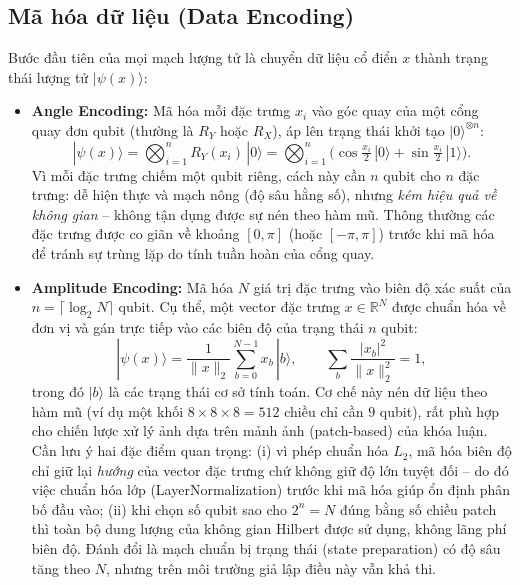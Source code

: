 \subsection{Mã hóa dữ liệu (Data Encoding)}
Bước đầu tiên của mọi mạch lượng tử là chuyển dữ liệu cổ điển $x$ thành trạng thái lượng tử $|\psi(x)\rangle$:
\begin{itemize}
    \item \textbf{Angle Encoding:} Mã hóa mỗi đặc trưng $x_i$ vào góc quay của một cổng quay đơn qubit (thường là $R_Y$ hoặc $R_X$), áp lên trạng thái khởi tạo $|0\rangle^{\otimes n}$:
    \begin{equation}
        |\psi(x)\rangle = \bigotimes_{i=1}^{n} R_Y(x_i)\,|0\rangle
        = \bigotimes_{i=1}^{n}\Big(\cos\tfrac{x_i}{2}\,|0\rangle + \sin\tfrac{x_i}{2}\,|1\rangle\Big).
    \end{equation}
    Vì mỗi đặc trưng chiếm một qubit riêng, cách này cần $n$ qubit cho $n$ đặc trưng: dễ hiện thực và mạch nông (độ sâu hằng số), nhưng \emph{kém hiệu quả về không gian} -- không tận dụng được sự nén theo hàm mũ. Thông thường các đặc trưng được co giãn về khoảng $[0, \pi]$ (hoặc $[-\pi,\pi]$) trước khi mã hóa để tránh sự trùng lặp do tính tuần hoàn của cổng quay.
    \item \textbf{Amplitude Encoding:} Mã hóa $N$ giá trị đặc trưng vào biên độ xác suất của $n=\lceil\log_2 N\rceil$ qubit. Cụ thể, một vector đặc trưng $x\in\mathbb{R}^{N}$ được chuẩn hóa về đơn vị và gán trực tiếp vào các biên độ của trạng thái $n$ qubit:
    \begin{equation}
        |\psi(x)\rangle = \frac{1}{\lVert x\rVert_2}\sum_{b=0}^{N-1} x_b\,|b\rangle,
        \qquad \sum_{b} \frac{|x_b|^2}{\lVert x\rVert_2^2} = 1,
    \end{equation}
    trong đó $|b\rangle$ là các trạng thái cơ sở tính toán. Cơ chế này nén dữ liệu theo hàm mũ (ví dụ một khối $8\times 8\times 8 = 512$ chiều chỉ cần $9$ qubit), rất phù hợp cho chiến lược xử lý ảnh dựa trên mảnh ảnh (patch-based) của khóa luận. Cần lưu ý hai đặc điểm quan trọng: (i) vì phép chuẩn hóa $L_2$, mã hóa biên độ chỉ giữ lại \emph{hướng} của vector đặc trưng chứ không giữ độ lớn tuyệt đối -- do đó việc chuẩn hóa lớp (LayerNormalization) trước khi mã hóa giúp ổn định phân bố đầu vào; (ii) khi chọn số qubit sao cho $2^{n}=N$ đúng bằng số chiều patch thì toàn bộ dung lượng của không gian Hilbert được sử dụng, không lãng phí biên độ. Đánh đổi là mạch chuẩn bị trạng thái (state preparation) có độ sâu tăng theo $N$, nhưng trên môi trường giả lập điều này vẫn khả thi.
\end{itemize}

